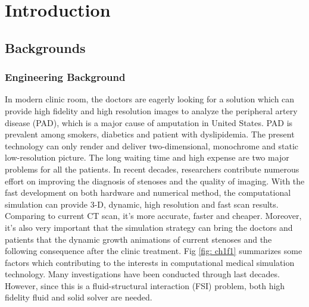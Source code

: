 \chapter{Introduction}
\label{ch:chap1}


\section{Backgrounds}

\subsection{Engineering Background}

In modern clinic room, the doctors are eagerly looking for a solution which can provide high fidelity and high resolution images to analyze the peripheral artery disease (PAD), which is a major cause of amputation in United States. PAD is prevalent among smokers, diabetics and patient with dyslipidemia. The  present technology can only render and deliver two-dimensional,  monochrome and static low-resolution picture. The long waiting time and high expense are two major problems for all the patients. In recent decades, researchers contribute numerous effort on improving the diagnosis of stenoses and the quality of imaging\cite{clark1976fluid, nesbitt2009shear, wardlaw2006non, stergiopulos1992computer, long2001numerical}. With the fast development on both hardware and numerical method, the computational simulation can provide 3-D, dynamic, high resolution and fast scan results. Comparing to current CT scan, it's more accurate, faster and cheaper. Moreover, it's also very important that the simulation strategy can bring the doctors and patients that the dynamic growth animations of current stenoses and the following consequence after the clinic treatment. Fig \ref{fig: ch1f1} summarizes some factors which contributing to the interests in computational medical simulation technology\cite{barry2005features}. Many investigations have been conducted through last decades\cite{feng2012viscous, bertram2010evaluation, nadeem2010simulation, ogulu2005simulation}. However, since this is a fluid-structural interaction (FSI) problem, both high fidelity fluid and solid solver are needed. 

